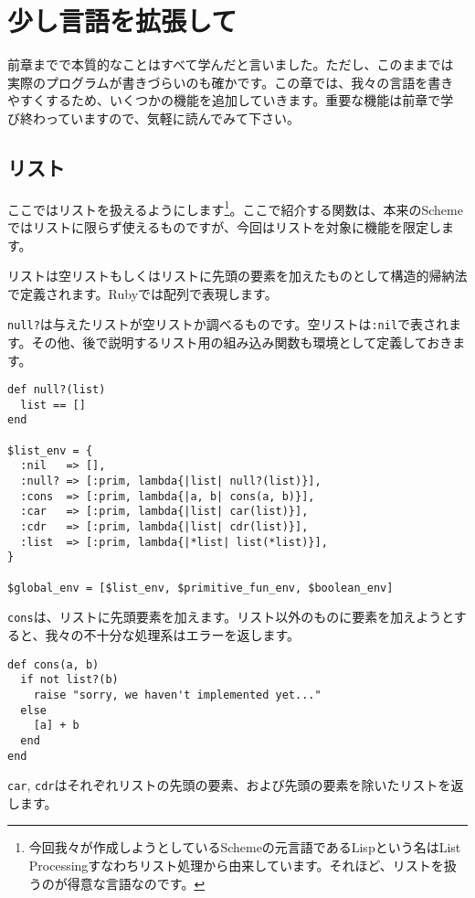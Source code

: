 \chapter{少し言語を拡張して\hspace{-3mm}}\label{chap:extend}
前章までで本質的なことはすべて学んだと言いました。ただし、このままでは
実際のプログラムが書きづらいのも確かです。この章では、我々の言語を書き
やすくするため、いくつかの機能を追加していきます。重要な機能は前章で学
び終わっていますので、気軽に読んでみて下さい。

\section{リスト}\label{sec:list}

ここではリストを扱えるようにします\footnote{今回我々が作成しようとしているSchemeの元言語であるLispという名はList Processingすなわちリスト処理から由来しています。それほど、リストを扱うのが得意な言語なのです。}。ここで紹介する関数は、本来のSchemeではリストに限らず使えるものですが、今回はリストを対象に機能を限定します。

リストは空リストもしくはリストに先頭の要素を加えたものとして構造的帰納法で定義されます。Rubyでは配列で表現します。

{\tt null?}は与えたリストが空リストか調べるものです。空リストは{\tt :nil}で表されます。その他、後で説明するリスト用の組み込み関数も環境として定義しておきます。

\begin{lstlisting}
def null?(list)
  list == []
end

$list_env = {
  :nil   => [],
  :null? => [:prim, lambda{|list| null?(list)}],
  :cons  => [:prim, lambda{|a, b| cons(a, b)}],
  :car   => [:prim, lambda{|list| car(list)}],
  :cdr   => [:prim, lambda{|list| cdr(list)}],
  :list  => [:prim, lambda{|*list| list(*list)}],
}

$global_env = [$list_env, $primitive_fun_env, $boolean_env]
\end{lstlisting}

{\tt cons}は、リストに先頭要素を加えます。リスト以外のものに要素を加えようとすると、我々の不十分な処理系はエラーを返します。

\begin{lstlisting}
def cons(a, b)
  if not list?(b)
    raise "sorry, we haven't implemented yet..."
  else
    [a] + b
  end
end
\end{lstlisting}

{\tt car}, {\tt cdr}はそれぞれリストの先頭の要素、および先頭の要素を除いたリストを返します。

